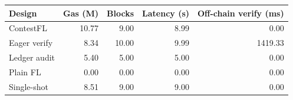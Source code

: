 \begin{tabular}{lrrrr}
\toprule
Design & Gas (M) & Blocks & Latency (s) & Off-chain verify (ms) \\
\midrule
ContestFL & 10.77 & 9.00 & 8.99 & 0.00 \\
Eager verify & 8.34 & 10.00 & 9.99 & 1419.33 \\
Ledger audit & 5.40 & 5.00 & 5.00 & 0.00 \\
Plain FL & 0.00 & 0.00 & 0.00 & 0.00 \\
Single-shot & 8.51 & 9.00 & 9.00 & 0.00 \\
\bottomrule
\end{tabular}

